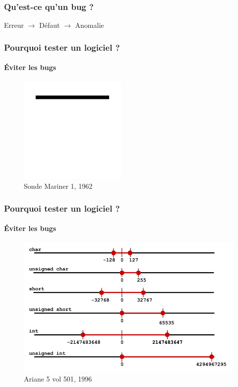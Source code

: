 \documentclass{beamer}
\begin{document}
\begin{frame}
	\frametitle{Qu'est-ce qu'un bug ?}
	
	Erreur $\rightarrow$ D\'{e}faut $\rightarrow$ Anomalie
\end{frame}

\begin{frame}
	\frametitle{Pourquoi tester un logiciel ?}
	\framesubtitle{\'{E}viter les bugs}
		\begin{figure}
			\centering
			\caption{Sonde Mariner 1, 1962}
			\includegraphics[scale=0.20]{img/mariner}
		\end{figure}
\end{frame}

\begin{frame}
	\frametitle{Pourquoi tester un logiciel ?}
	\framesubtitle{\'{E}viter les bugs}
		\begin{figure}
			\centering
			\caption{Ariane 5 vol 501, 1996}
			\includegraphics[scale=0.25]{img/ariane}
		\end{figure}
\end{frame}
\end{document}
